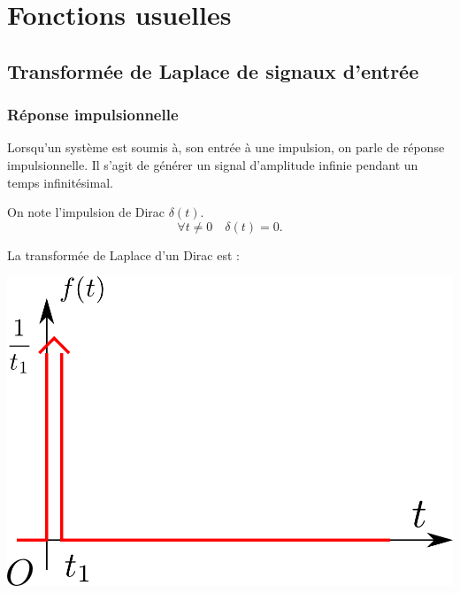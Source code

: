\documentclass[10pt,fleqn]{article} %
\begin{document}
\section{Fonctions usuelles}
\subsection{Transformée de Laplace de signaux d'entrée}
\subsubsection*{Réponse impulsionnelle}
Lorsqu'un système est soumis à, son entrée à une impulsion, on parle de réponse impulsionnelle. Il s'agit de générer un signal d'amplitude infinie pendant un temps infinitésimal. 

\begin{minipage}[c]{.6\linewidth}
\begin{defi}
On note l'impulsion de Dirac $\delta(t)$.
$$
\forall t \neq 0 \quad \delta(t)=0.
$$

La transformée de Laplace d'un Dirac est :

\end{defi}
\end{minipage} \hfill
\begin{minipage}[c]{.35\linewidth}
\begin{center}
\includegraphics[width=.9\textwidth]{images/dirac}
\end{center}
\end{minipage}
\end{document}
